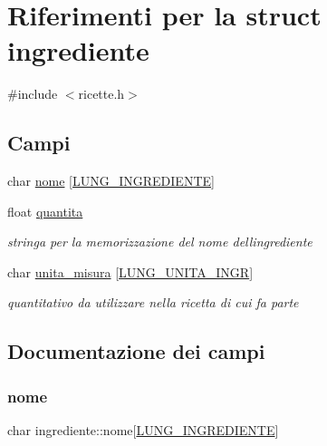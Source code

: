 \hypertarget{structingrediente}{}\section{Riferimenti per la struct ingrediente}
\label{structingrediente}


{\ttfamily \#include $<$ricette.\+h$>$}

\subsection*{Campi}
\begin{DoxyCompactItemize}
\item 
char \hyperlink{structingrediente_abc3e24e6f64482d852f4911224236939}{nome} \mbox{[}\hyperlink{ricette_8h_a4cfbc12da1c68bf747428d14ce5b1a24}{L\+U\+N\+G\+\_\+\+I\+N\+G\+R\+E\+D\+I\+E\+N\+TE}\mbox{]}
\item 
float \hyperlink{structingrediente_ad790202dff2ec007bdff02bb6d6635b0}{quantita}
\begin{DoxyCompactList}\small\item\em stringa per la memorizzazione del nome dell\textquotesingle{}ingrediente \end{DoxyCompactList}\item 
char \hyperlink{structingrediente_ad56d9ae84adc710b29d7466ba3f39389}{unita\+\_\+misura} \mbox{[}\hyperlink{ricette_8h_a4e785f2d1bf6a16d97c0c9c2393c8545}{L\+U\+N\+G\+\_\+\+U\+N\+I\+T\+A\+\_\+\+I\+N\+GR}\mbox{]}
\begin{DoxyCompactList}\small\item\em quantitativo da utilizzare nella ricetta di cui fa parte \end{DoxyCompactList}\end{DoxyCompactItemize}


\subsection{Documentazione dei campi}
\mbox{\label{structingrediente_abc3e24e6f64482d852f4911224236939}} 
\subsubsection{\texorpdfstring{nome}{nome}}
{\footnotesize\ttfamily char ingrediente\+::nome\mbox{[}\hyperlink{ricette_8h_a4cfbc12da1c68bf747428d14ce5b1a24}{L\+U\+N\+G\+\_\+\+I\+N\+G\+R\+E\+D\+I\+E\+N\+TE}\mbox{]}}

